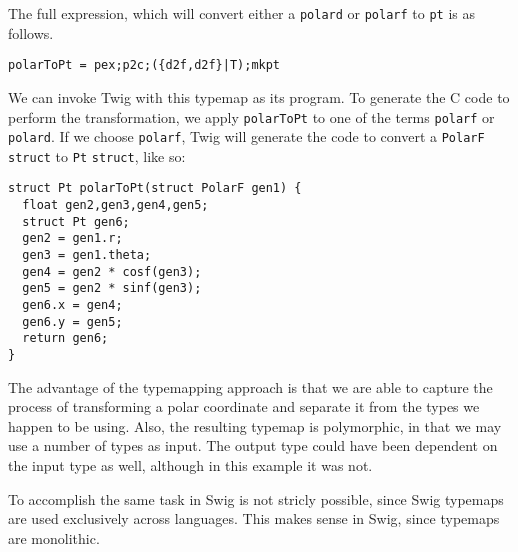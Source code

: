 The full expression, which will convert either a \texttt{polard} or \texttt{polarf} to \texttt{pt} is as follows.

\begin{verbatim}
polarToPt = pex;p2c;({d2f,d2f}|T);mkpt
\end{verbatim}

We can invoke Twig with this typemap as its program. To generate the C code to perform the transformation, we apply \texttt{polarToPt} to one of the terms \texttt{polarf} or \texttt{polard}. If we choose \texttt{polarf}, Twig will generate the code to convert a \texttt{PolarF} \texttt{struct} to \texttt{Pt} \texttt{struct}, like so:

\begin{verbatim}
struct Pt polarToPt(struct PolarF gen1) {
  float gen2,gen3,gen4,gen5;
  struct Pt gen6;
  gen2 = gen1.r;
  gen3 = gen1.theta;
  gen4 = gen2 * cosf(gen3);
  gen5 = gen2 * sinf(gen3);
  gen6.x = gen4;
  gen6.y = gen5;
  return gen6;
}
\end{verbatim}

The advantage of the typemapping approach is that we are able to capture the process of transforming a polar coordinate and separate it from the types we happen to be using. Also, the resulting typemap is polymorphic, in that we may use a number of types as input. The output type could have been dependent on the input type as well, although in this example it was not.

To accomplish the same task in Swig is not stricly possible, since Swig typemaps are used exclusively across languages. This makes sense in Swig, since typemaps are monolithic.

